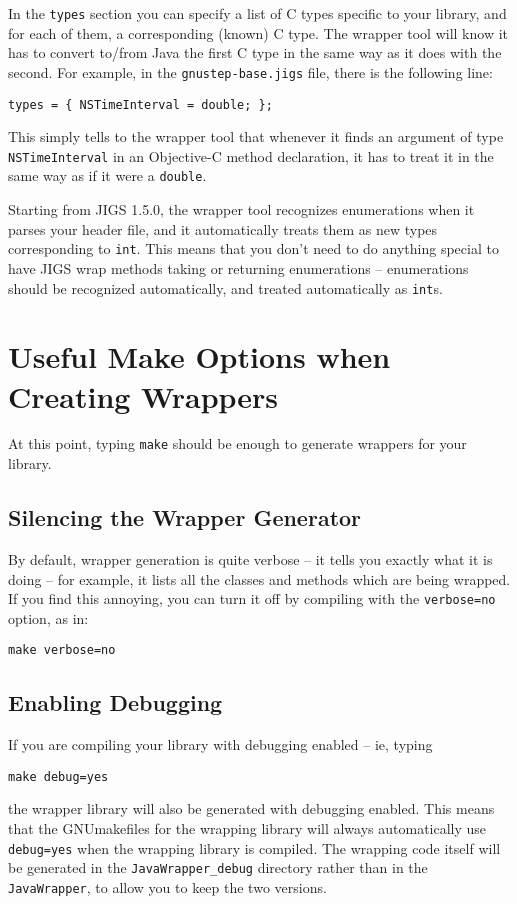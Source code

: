 In the \texttt{types} section you can specify a list of C types
specific to your library, and for each of them, a corresponding
(known) C type.  The wrapper tool will know it has to convert to/from
Java the first C type in the same way as it does with the second.  For
example, in the \texttt{gnustep-base.jigs} file, there is the
following line:
\begin{verbatim}
types = { NSTimeInterval = double; };
\end{verbatim}
This simply tells to the wrapper tool that whenever it finds an argument 
of type \texttt{NSTimeInterval} in an Objective-C method declaration, it 
has to treat it in the same way as if it were a \texttt{double}.

Starting from JIGS 1.5.0, the wrapper tool recognizes enumerations
when it parses your header file, and it automatically treats them as
new types corresponding to \texttt{int}.  This means that you don't
need to do anything special to have JIGS wrap methods taking or
returning enumerations -- enumerations should be recognized
automatically, and treated automatically as \texttt{int}s.

\section{Useful Make Options when Creating Wrappers}

At this point, typing \texttt{make} should be enough to generate
wrappers for your library.  

\subsection{Silencing the Wrapper Generator}

By default, wrapper generation is quite verbose -- it tells you
exactly what it is doing -- for example, it lists all the classes and
methods which are being wrapped.  If you find this annoying, you can
turn it off by compiling with the \texttt{verbose=no} option, as in:
\begin{verbatim}
make verbose=no
\end{verbatim}

\subsection{Enabling Debugging}

If you are compiling your library with debugging enabled  -- ie, typing
\begin{verbatim}
make debug=yes
\end{verbatim}
the wrapper library will also be generated with debugging enabled.
This means that the GNUmakefiles for the wrapping library will
always automatically use \texttt{debug=yes} when the wrapping library
is compiled.  The wrapping code itself will be generated in the
\texttt{JavaWrapper\_debug} directory rather than in the \texttt{JavaWrapper}, 
to allow you to keep the two versions.

